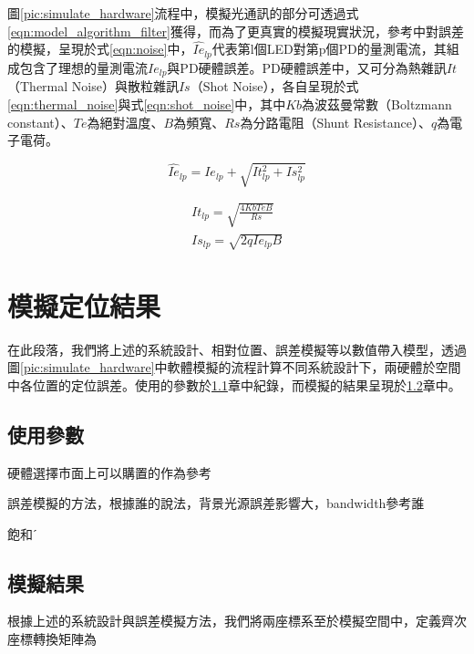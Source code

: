     圖\ref{pic:simulate_hardware}流程中，模擬光通訊的部分可透過式\ref{eqn:model_algorithm_filter}獲得，而為了更真實的模擬現實狀況，參考\cite{survey_light2018}中對誤差的模擬，呈現於式\ref{eqn:noise}中，$\hat{Ie}_{lp}$代表第l個LED對第p個PD的量測電流，其組成包含了理想的量測電流$Ie_{lp}$與PD硬體誤差。PD硬體誤差中，又可分為熱雜訊$It$（Thermal Noise）與散粒雜訊$Is$（Shot Noise），各自呈現於式\ref{eqn:thermal_noise}與式\ref{eqn:shot_noise}中，其中$Kb$為波茲曼常數（Boltzmann constant）、$Te$為絕對溫度、$B$為頻寬、$Rs$為分路電阻（Shunt Resistance）、$q$為電子電荷。

    \begin{equation}
    \label{eqn:noise}
        \hat{Ie}_{lp}=Ie_{lp}+\sqrt{It_{lp}^2+Is_{lp}^2} 
    \end{equation}


    \begin{gather}
        \label{eqn:thermal_noise}
        It_{lp}=\sqrt{\frac{4 Kb Te B}{Rs}}\\
        \label{eqn:shot_noise}
        Is_{lp}=\sqrt{2qIe_{lp}B}
    \end{gather}



\section{模擬定位結果}
\label{chp:simulate_result}

在此段落，我們將上述的系統設計、相對位置、誤差模擬等以數值帶入模型，透過圖\ref{pic:simulate_hardware}中軟體模擬的流程計算不同系統設計下，兩硬體於空間中各位置的定位誤差。使用的參數於\ref{chp:simulate_para}章中紀錄，而模擬的結果呈現於\ref{chp:simulate_result_sub}章中。

\subsection{使用參數}
\label{chp:simulate_para}

硬體選擇市面上可以購置的作為參考

誤差模擬的方法，根據誰的說法，背景光源誤差影響大，bandwidth參考誰


飽和ˊ

\subsection{模擬結果}
\label{chp:simulate_result_sub}

根據上述的系統設計與誤差模擬方法，我們將兩座標系至於模擬空間中，定義齊次座標轉換矩陣為

